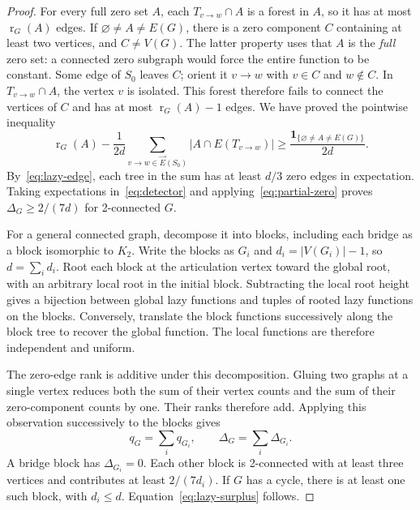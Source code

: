 \documentclass[11pt,reqno]{amsart}
\theoremstyle{remark}
\numberwithin{equation}{section}
\newcommand{\one}{\mathbf 1}
\DeclareMathOperator{\rk}{r}
\begin{document}
\begin{proof}
For every full zero set $A$, each $T_{v\to w}\cap A$ is a forest in
$A$, so it has at most $\rk_G(A)$ edges. If
$\varnothing\ne A\ne E(G)$, there is a zero component $C$ containing
at least two vertices, and $C\ne V(G)$. The latter property uses that
$A$ is the \emph{full} zero set: a connected zero subgraph would force
the entire function to be constant. Some edge of $S_0$ leaves $C$;
orient it $v\to w$ with $v\in C$ and $w\notin C$. In
$T_{v\to w}\cap A$, the vertex $v$ is isolated. This forest therefore
fails to connect the vertices of $C$ and has at most $\rk_G(A)-1$ edges.
We have proved the pointwise inequality
\begin{equation}\label{eq:detector}
 \rk_G(A)-\frac1{2d}\sum_{v\to w\in\vec E(S_0)}
                          |A\cap E(T_{v\to w})|
 \ge\frac{\one_{\{\varnothing\ne A\ne E(G)\}}}{2d}.
\end{equation}
By~\eqref{eq:lazy-edge}, each tree in the sum has at least $d/3$
zero edges in expectation. Taking expectations in~\eqref{eq:detector}
and applying~\eqref{eq:partial-zero} proves
$\Delta_G\ge2/(7d)$ for 2-connected $G$.

For a general connected graph, decompose it into blocks, including each
bridge as a block isomorphic to $K_2$. Write the blocks as $G_i$ and
$d_i=|V(G_i)|-1$, so $d=\sum_i d_i$. Root each block at the articulation
vertex toward the global root, with an arbitrary local root in the
initial block. Subtracting the local root height gives a bijection
between global lazy functions and tuples of rooted lazy functions on
the blocks. Conversely, translate the block functions successively
along the block tree to recover the global function. The local
functions are therefore independent and uniform.

The zero-edge rank is additive under this decomposition. Gluing two
graphs at a single vertex reduces both the sum of their vertex counts
and the sum of their zero-component counts by one. Their ranks
therefore add. Applying this observation successively to the blocks gives
\begin{equation}\label{eq:block-ranks}
 q_G=\sum_i q_{G_i},\qquad
 \Delta_G=\sum_i\Delta_{G_i}.
\end{equation}
A bridge block has $\Delta_{G_i}=0$. Each other block is 2-connected
with at least three vertices and contributes at least $2/(7d_i)$.
If $G$ has a cycle, there is at least one such block, with $d_i\le d$.
Equation~\eqref{eq:lazy-surplus} follows.
\end{proof}
\end{document}
